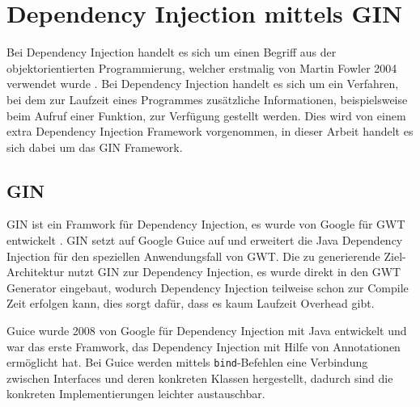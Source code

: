 \section{Dependency Injection mittels GIN} \label{GIN}
Bei Dependency Injection handelt es sich um einen Begriff aus der
objektorientierten Programmierung, welcher erstmalig von Martin Fowler 2004
verwendet wurde \cite{bib:DI}. Bei Dependency Injection handelt es sich um
ein Verfahren, bei dem zur Laufzeit eines Programmes zusätzliche Informationen,
beispielsweise beim Aufruf einer Funktion, zur Verfügung gestellt werden. Dies
wird von einem extra Dependency Injection Framework vorgenommen, in dieser
Arbeit handelt es sich dabei um das GIN Framework.

\subsection{GIN}
GIN ist ein Framwork für Dependency Injection, es wurde von Google
für GWT entwickelt \cite[GIN]{bib:gin}. GIN setzt auf Google Guice
\cite[Guice]{bib:guice} auf und erweitert die Java Dependency Injection für den
speziellen Anwendungsfall von GWT. Die zu generierende Ziel-Architektur nutzt
GIN zur Dependency Injection, es wurde direkt in den GWT Generator eingebaut,
wodurch Dependency Injection teilweise schon zur Compile Zeit erfolgen kann,
dies sorgt dafür, dass es kaum Laufzeit Overhead gibt.

Guice wurde 2008 von Google für Dependency Injection mit Java entwickelt und war
das erste Framwork, das Dependency Injection mit Hilfe von Annotationen
ermöglicht hat. Bei Guice werden mittels \texttt{bind}-Befehlen eine Verbindung
zwischen Interfaces und deren konkreten Klassen hergestellt, dadurch sind die konkreten
Implementierungen leichter austauschbar.

